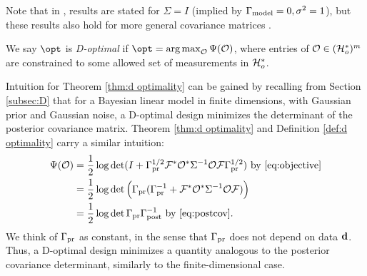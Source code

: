 Note that in \cite{AlexanderianGloorGhattas14,
  alexanderian2018efficient}, results are stated for \(\Sigma=I\)
(implied by \(\Gamma_{\textup{model}} = 0,\sigma^2=1\)), but these results also hold
for more general covariance matrices
\cite[p. 681]{AlexanderianGloorGhattas14}.

\begin{definition}\label{def:d optimality}
  We say \(\opt\) is \emph{D-optimal} if \(\opt =
  \argmax_{\obs} \tar(\obs)\), where entries of \(\mathcal{O} \in (\mathcal{H}_o^*)^m\)
  are constrained to some allowed set of measurements in \(\mathcal{H}_o^*\).
\end{definition}

Intuition for Theorem \ref{thm:d optimality} can be gained by
recalling from Section \ref{subsec:D} that for a Bayesian linear model
in finite dimensions, with Gaussian prior and Gaussian noise, a
D-optimal design minimizes the determinant of the posterior covariance
matrix. Theorem
\ref{thm:d optimality} and Definition \ref{def:d optimality} carry a
similar intuition:
\begin{align*}
  \begin{split}
    \tar(\obs) &= \frac12 \log \det ( I + \prcov^{1/2}  \fwd ^* \obs^* \Sigma^{-1} \obs \fwd \prcov^{1/2}) \text{ by \eqref{eq:objective}}\\
    &= \frac12 \log \det \Big( \prcov ( \prcov^{-1} + \fwd ^* \obs^* \Sigma^{-1} \obs \fwd) \Big )\\
    &= \frac12 \log \det \prcov \postcov^{-1} \text{ by \eqref{eq:postcov}}.
  \end{split}
\end{align*}
We think of \(\Gamma_{\textup{pr}}\) as constant, in the sense that $\Gamma_{\textup{pr}}$ does
not depend on data $\mathbf{d}$. Thus, a D-optimal design minimizes a
quantity analogous to the posterior covariance determinant, similarly
to the finite-dimensional case.


